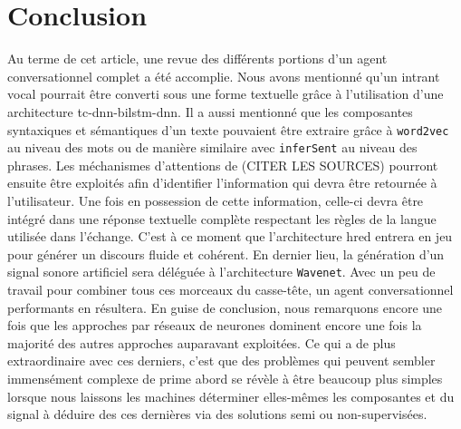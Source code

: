 \section*{Conclusion}
Au terme de cet article, une revue des différents portions d'un agent conversationnel complet a été accomplie. Nous avons mentionné qu'un intrant vocal pourrait être converti sous une forme textuelle grâce à l'utilisation d'une architecture \gls{tc}-\gls{dnn}-\gls{bilstm}-\gls{dnn}. Il a aussi mentionné que les composantes syntaxiques et sémantiques d'un texte pouvaient être extraire grâce à \texttt{word2vec} au niveau des mots ou de manière similaire avec \texttt{inferSent} au niveau des phrases. Les méchanismes d'attentions de (CITER LES SOURCES) pourront ensuite être exploités afin d’identifier l'information qui devra être retournée à l'utilisateur. Une fois en possession de cette information, celle-ci devra être intégré dans une réponse textuelle complète respectant les règles de la langue utilisée dans l'échange. C'est à ce moment que l'architecture \gls{hred} entrera en jeu pour générer un discours fluide et cohérent. En dernier lieu, la génération d'un signal sonore artificiel sera déléguée à l'architecture \texttt{Wavenet}. Avec un peu de travail pour combiner tous ces morceaux du casse-tête, un agent conversationnel performants en résultera. En guise de conclusion, nous remarquons encore une fois que les approches par réseaux de neurones dominent encore une fois la majorité des autres approches auparavant exploitées. Ce qui a de plus extraordinaire avec ces derniers, c'est que des problèmes qui peuvent sembler immensément complexe de prime abord se révèle à être beaucoup plus simples lorsque nous laissons les machines déterminer elles-mêmes les composantes et du signal à déduire des ces dernières via des solutions semi ou non-supervisées.
